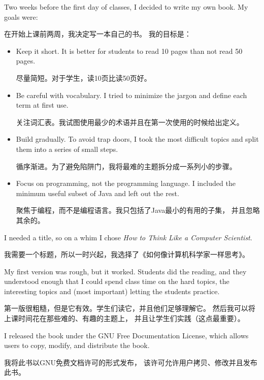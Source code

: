 \documentclass[10pt]{book}
\begin{document}
\begin{CJK}{UTF8}{gbsn}
Two weeks before the first day of classes, I decided to write my
own book.  
My goals were:

在开始上课前两周，我决定写一本自己的书。
我的目标是：

\begin{itemize}

\item Keep it short.  It is better for students to read 10 pages
than not read 50 pages.

尽量简短。对于学生，读10页比读50页好。

\item Be careful with vocabulary.  I tried to minimize the jargon
and define each term at first use.

关注词汇表。我试图使用最少的术语并且在第一次使用的时候给出定义。

\item Build gradually. To avoid trap doors, I took the most difficult
topics and split them into a series of small steps. 

循序渐进。为了避免陷阱门，我将最难的主题拆分成一系列小的步骤。

\item Focus on programming, not the programming language.  I included
the minimum useful subset of Java and left out the rest.

聚焦于编程，而不是编程语言。我只包括了Java最小的有用的子集，
并且忽略其余的。

\end{itemize}

I needed a title, so on a whim I chose {\em How to Think Like
a Computer Scientist}.

我需要一个标题，所以一时兴起，我选择了《如何像计算机科学家一样思考》。

My first version was rough, but it worked.  Students did the reading,
and they understood enough that I could spend class time on the hard
topics, the interesting topics and (most important) letting the
students practice.

第一版很粗糙，但是它有效。学生们读它，并且他们足够理解它。
然后我可以将上课时间花在那些难的、有趣的主题上，
并且让学生们实践（这点最重要）。

I released the book under the GNU Free Documentation License,
which allows users to copy, modify, and distribute the book.

我将此书以GNU免费文档许可的形式发布，
该许可允许用户拷贝、修改并且发布此书。


\end{CJK}
\end{document}
